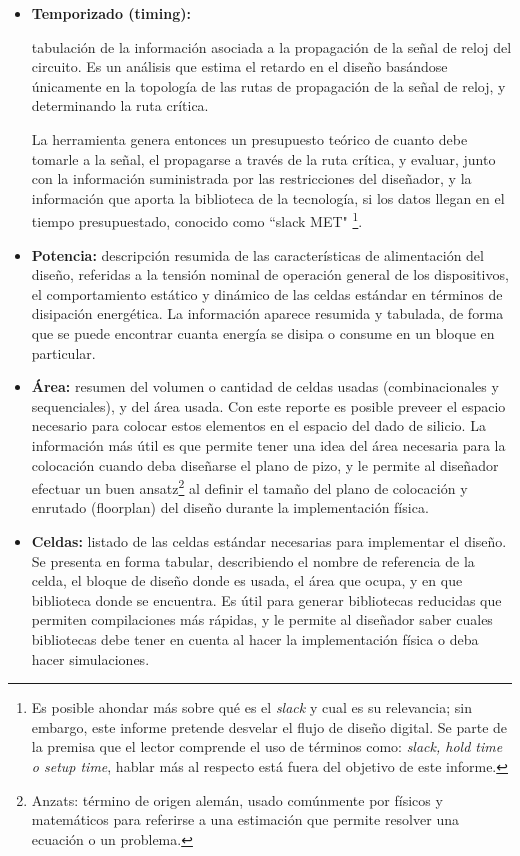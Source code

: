 \begin{itemize}
\item \textbf{Temporizado (timing):} {tabulación de la información asociada a la propagación de la señal de reloj del circuito. Es un análisis que estima el retardo en el diseño basándose únicamente en la topología de las rutas de propagación de la señal de reloj, y determinando la ruta crítica.

La herramienta genera entonces un presupuesto teórico de cuanto debe tomarle a la señal, el propagarse a través de la ruta crítica, y evaluar, junto con la información suministrada por las restricciones del diseñador, y la información que aporta la biblioteca de la tecnología, si los datos llegan en el tiempo presupuestado, conocido como ``slack MET" \footnote{Es posible ahondar más sobre qué es el \textit{slack} y cual es su relevancia; sin embargo, este informe pretende desvelar el flujo de diseño digital. Se parte de la premisa que el lector comprende el uso de términos como: \textit{slack, hold time o setup time}, hablar más al respecto está fuera del objetivo de este informe.}.}

\item \textbf{Potencia:} {descripción resumida de las características de alimentación del diseño, referidas a la tensión nominal de operación general de los dispositivos, el comportamiento estático y dinámico de las celdas estándar en términos de disipación energética. La información aparece resumida y tabulada, de forma que se puede encontrar cuanta energía se disipa o consume en un bloque en particular.}

\item \textbf{Área:} {resumen del volumen o cantidad de celdas usadas (combinacionales y sequenciales), y del área usada. Con este reporte es posible preveer el espacio necesario para colocar estos elementos en el espacio del dado de silicio. La información más útil es que permite tener una idea del área necesaria para la colocación cuando deba diseñarse el plano de pizo, y le permite al diseñador efectuar un buen ansatz\footnote{Anzats: término de origen alemán, usado comúnmente por físicos y matemáticos para referirse a una estimación que permite resolver una ecuación o un problema.} al definir el tamaño del plano de colocación y enrutado (floorplan) del diseño durante la implementación física.}

\item \textbf{Celdas:} {listado de las celdas estándar necesarias para implementar el diseño. Se presenta en forma tabular, describiendo el nombre de referencia de la celda, el bloque de diseño donde es usada, el área que ocupa, y en que biblioteca donde se encuentra. Es útil para generar bibliotecas reducidas que permiten compilaciones más rápidas, y le permite al diseñador saber cuales bibliotecas debe tener en cuenta al hacer la implementación física o deba hacer simulaciones.}



\end{itemize}
